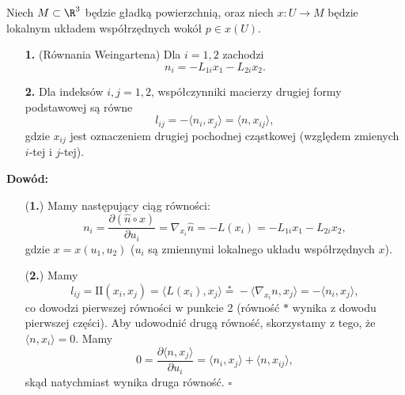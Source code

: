 \begin{frame}[<+->]

\begin{lemat}
Niech $M\subset \R^3$ będzie gładką powierzchnią, oraz niech $x\colon U\to M$ będzie lokalnym układem współrzędnych wokół $p\in x(U)$.
\begin{enumerate}
\item [\textbf{1.}](Równania Weingartena) Dla $i=1,2$ zachodzi 
\[n_i=-L_{1i}x_1-L_{2i}x_2.\]
\item [\textbf{2.}]Dla indeksów $i,j=1,2$, współczynniki macierzy drugiej formy podstawowej są równe
\[l_{ij}=-\langle n_i,x_j\rangle=\langle n,x_{ij}\rangle,\]
gdzie $x_{ij}$ jest oznaczeniem drugiej pochodnej cząstkowej (względem zmienych $i$-tej i $j$-tej).
\end{enumerate}
\end{lemat}
\end{frame}
\begin{frame}

\textcolor{ared}{\textbf{Dowód:}}\\\pause 
\begin{enumerate}
\item [(\textbf{1.})]Mamy następujący ciąg równości:
\[n_i=\frac{\partial(\widehat{n}\circ x)}{\partial u_i}=\nabla_{x_i}\widehat{n}=-L(x_i)=-L_{1i}x_1-L_{2i}x_2,\]
gdzie $x=x(u_1,u_2)$ ($u_i$ są zmiennymi lokalnego układu współrzędnych $x$).
\pause \item [(\textbf{2.})]
Mamy \[l_{ij}=\text{II}(x_i,x_j)=\langle L(x_i),x_j\rangle\stackrel{*}{=}-\langle\nabla_{x_i}n,x_j\rangle=-\langle n_i,x_j\rangle,\]
co dowodzi pierwszej równości w punkcie 2 (równość $*$ wynika z dowodu pierwszej części). \pause Aby udowodnić drugą równość, skorzystamy z tego, że $\langle n, x_i\rangle=0$. Mamy 
\pause \[0=\frac{\partial \langle n,x_j\rangle}{\partial u_i}=\langle n_i,x_j\rangle+\langle n,x_{ij}\rangle,\]skąd natychmiast wynika druga równość. \hfill $\square$
\end{enumerate}

\end{frame}
